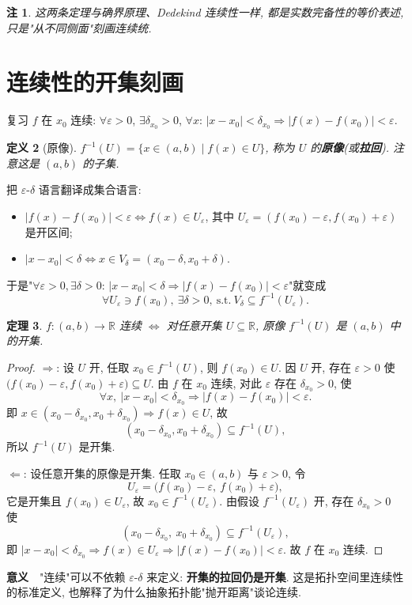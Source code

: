 \documentclass[UTF8,11pt]{ctexart}
\theoremstyle{cnthm}
\newtheorem{thm}{定理}[section]
\newtheorem{defn}[thm]{定义}
\newtheorem{rem}[thm]{注}
\begin{document}
\begin{rem}
这两条定理与确界原理、Dedekind 连续性一样, 都是实数完备性的等价表述, 只是"从不同侧面"刻画连续统.
\end{rem}

\section{连续性的开集刻画}

复习 $f$ 在 $x_0$ 连续: $\forall\varepsilon>0$, $\exists\delta_{x_0}>0$, $\forall x$: $|x-x_0|<\delta_{x_0}\Rightarrow|f(x)-f(x_0)|<\varepsilon$.

\begin{defn}[原像]
$f^{-1}(U)=\{x\in(a,b)\mid f(x)\in U\}$, 称为 $U$ 的\textbf{原像}(或\textbf{拉回}). 注意这是 $(a,b)$ 的子集.
\end{defn}

把 $\varepsilon$-$\delta$ 语言翻译成集合语言:

\begin{itemize}
\item $|f(x)-f(x_0)|<\varepsilon\iff f(x)\in U_\varepsilon$, 其中 $U_\varepsilon=(f(x_0)-\varepsilon,f(x_0)+\varepsilon)$ 是开区间;
\item $|x-x_0|<\delta\iff x\in V_\delta=(x_0-\delta,x_0+\delta)$.
\end{itemize}

于是"$\forall\varepsilon>0,\exists\delta>0$: $|x-x_0|<\delta\Rightarrow|f(x)-f(x_0)|<\varepsilon$"就变成
\[
\forall U_\varepsilon\ni f(x_0),\ \exists\delta>0,\ \text{s.t.}\ V_\delta\subseteq f^{-1}(U_\varepsilon).
\]

\begin{thm}
$f:(a,b)\to\mathbb{R}$ 连续 $\iff$ 对任意开集 $U\subseteq\mathbb{R}$, 原像 $f^{-1}(U)$ 是 $(a,b)$ 中的开集.
\end{thm}

\begin{proof}
$\Rightarrow$: 设 $U$ 开, 任取 $x_0\in f^{-1}(U)$, 则 $f(x_0)\in U$. 因 $U$ 开, 存在 $\varepsilon>0$ 使 $\bigl(f(x_0)-\varepsilon,f(x_0)+\varepsilon\bigr)\subseteq U$. 由 $f$ 在 $x_0$ 连续, 对此 $\varepsilon$ 存在 $\delta_{x_0}>0$, 使
\[
\forall x,\ |x-x_0|<\delta_{x_0}\Rightarrow|f(x)-f(x_0)|<\varepsilon .
\]
即 $x\in(x_0-\delta_{x_0},x_0+\delta_{x_0})\Rightarrow f(x)\in U$, 故
\[
(x_0-\delta_{x_0},x_0+\delta_{x_0})\subseteq f^{-1}(U),
\]
所以 $f^{-1}(U)$ 是开集.

$\Leftarrow$: 设任意开集的原像是开集. 任取 $x_0\in(a,b)$ 与 $\varepsilon>0$, 令
\[
U_\varepsilon=\bigl(f(x_0)-\varepsilon,\ f(x_0)+\varepsilon\bigr),
\]
它是开集且 $f(x_0)\in U_\varepsilon$, 故 $x_0\in f^{-1}(U_\varepsilon)$. 由假设 $f^{-1}(U_\varepsilon)$ 开, 存在 $\delta_{x_0}>0$ 使
\[
(x_0-\delta_{x_0},\ x_0+\delta_{x_0})\subseteq f^{-1}(U_\varepsilon),
\]
即 $|x-x_0|<\delta_{x_0}\Rightarrow f(x)\in U_\varepsilon\Rightarrow|f(x)-f(x_0)|<\varepsilon$. 故 $f$ 在 $x_0$ 连续.
\end{proof}

\textbf{意义}　"连续"可以不依赖 $\varepsilon$-$\delta$ 来定义: \textbf{开集的拉回仍是开集}. 这是拓扑空间里连续性的标准定义, 也解释了为什么抽象拓扑能"抛开距离"谈论连续.
\end{document}
